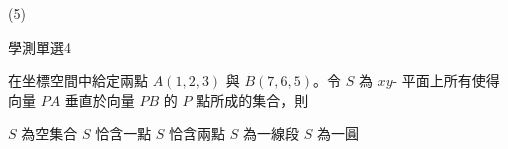 \begin{QUESTIONS}
\begin{QUESTION}
\begin{QBODY}
\begin{QOPS}
                \QOP {}
            \end{QOPS}
        \end{QBODY}
        \begin{QFROMS}
        \end{QFROMS}
        \begin{QTAGS}\end{QTAGS}
        \begin{QANS}
            (5)
        \end{QANS}
        \begin{QSOLLIST}
        \end{QSOLLIST}
        \begin{QEMPTYSPACE}
        \end{QEMPTYSPACE}
    \end{QUESTION}
    \begin{QUESTION}
        \begin{ExamInfo}{93}{學測}{單選}{4}
        \end{ExamInfo}
        \begin{ExamAnsRateInfo}{23}{42}{17}{10}
        \end{ExamAnsRateInfo}
        \begin{QBODY}
            在坐標空間中給定兩點 $A(1,2,3)$ 與 $B(7,6,5)$。令 $S$ 為 $xy$- 平面上所有使得向量 $PA$ 垂直於向量 $PB$ 的 $P$ 點所成的集合，則
            \begin{QOPS} 
                \QOP $S$ 為空集合 
                \QOP $S$ 恰含一點 
                \QOP $S$ 恰含兩點 
                \QOP $S$ 為一線段 
                \QOP $S$ 為一圓
            \end{QOPS}
        \end{QBODY}
        \begin{QFROMS}
        \end{QFROMS}
        \begin{QTAGS}\end{QTAGS}

\end{QUESTION}
\end{QUESTIONS}
